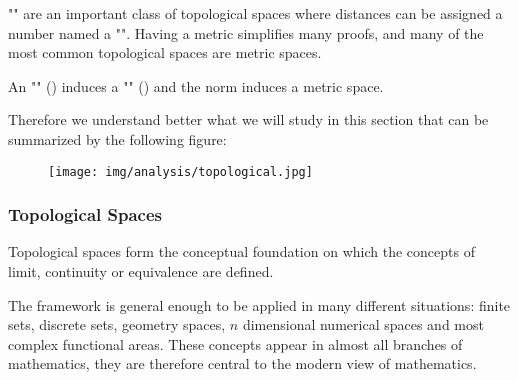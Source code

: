 	"\label{metric space}" are an important class of topological spaces where distances can be assigned a number named a "\label{metric}". Having a metric simplifies many proofs, and many of the most common topological spaces are metric spaces.
	
	An "" () induces a ""  () and the norm induces a metric space. 
	
	Therefore we understand better what we will study in this section that can be summarized by the following figure:
	\begin{figure}[H]
		\centering
		\texttt{[image: img/analysis/topological.jpg]}
	\end{figure}

	\subsubsection{Topological Spaces}
	Topological spaces form the conceptual foundation on which the concepts of limit, continuity or equivalence are defined.
	
	The framework is general enough to be applied in many different situations: finite sets, discrete sets, geometry spaces, $n$ dimensional numerical spaces and most complex functional areas. These concepts appear in almost all branches of mathematics, they are therefore central to the modern view of mathematics.
	

